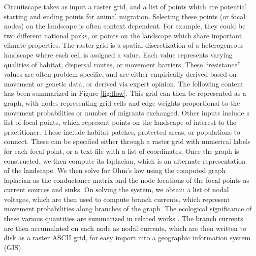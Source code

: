 \documentclass{juliacon}
\begin{document}
Circuitscape takes as input a raster grid, and a list of points which are potential starting and ending points for animal migration. Selecting these points (or focal nodes) on the landscape is often context dependent. For example, they could be two different national parks, or points on the landscape which share important climate properties. The raster grid is a spatial discretization of a heterogeneous landscape where each cell is assigned a value. Each value represents varying qualities of habitat, dispersal routes, or movement barriers. These “resistance” values are often problem specific, and are either empirically derived based on movement or genetic data, or derived via expert opinion. The following content has been summarized in Figure \ref{fig:flow}. This grid can then be represented as a graph, with nodes representing grid cells and edge weights proportional to the movement probabilities or number of migrants exchanged. Other inputs include a list of focal points, which represent points on the landscape of interest to the practitioner. These include habitat patches, protected areas, or populations to connect. These can be specified either through a raster grid with numerical labels for each focal point, or a text file with a list of coordinates. Once the graph is constructed, we then compute its laplacian, which is an alternate representation of the landscape. We then solve for Ohm’s law using the computed graph laplacian as the conductance matrix and the node locations of the focal points as current sources and sinks. On solving the system, we obtain a list of nodal voltages, which are then used to compute branch currents, which represent movement probabilities along branches of the graph. The ecological significance of these various quantities are summarized in related works \cite{mcrae2008using}. The branch currents are then accumulated on each node as nodal currents, which are then written to disk as a raster ASCII grid, for easy import into a geographic information system (GIS). 
\end{document}
